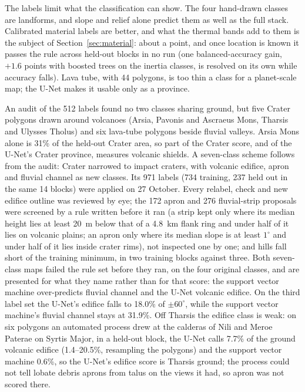 \documentclass[twocolumn]{aastex701}
\newcommand{\pmsixty}{$\pm60^{\circ}$}
\begin{document}
The labels limit what the classification can show. The four hand-drawn classes are landforms, and slope and relief
alone predict them as well as the full stack. Calibrated material labels are better, and what the thermal bands add to them is the subject of
Section~\ref{sec:material}: about a point, and once location is known it passes the rule across held-out blocks in no
run (one balanced-accuracy gain, $+1.6$ points with boosted trees on the inertia classes, is resolved on its own while
accuracy falls).
Lava tube, with 44 polygons, is too thin a class for a planet-scale map; the U-Net makes it
usable only as a province.

An audit of the 512 labels found no two classes sharing ground, but five Crater polygons drawn around volcanoes (Arsia,
Pavonis and Ascraeus Mons, Tharsis and Ulysses Tholus) and six lava-tube polygons beside fluvial valleys. Arsia Mons
alone is 31\% of the held-out Crater area, so part of the Crater score, and of the U-Net's Crater province, measures
volcanic shields. A seven-class scheme follows from the audit: Crater narrowed to impact craters, with volcanic edifice,
apron and fluvial channel as new classes. Its 971 labels (734 training, 237 held out in the same 14 blocks) were
applied on 27 October. Every relabel, check and new edifice outline was reviewed by eye; the 172 apron and 276
fluvial-strip proposals were screened by a rule written before it ran (a strip kept only where its median height lies
at least 20~m below that of a 4.8~km flank ring and under half of it lies on volcanic plains; an apron only where its
median slope is at least $1^{\circ}$ and under half of it lies inside crater rims), not inspected one by one; and
hills fall short of the training minimum, in two training blocks against three. Both seven-class maps failed the
rule set before they ran, on the four original classes, and are presented for what they name rather than for that
score: the support vector machine over-predicts fluvial channel and the U-Net volcanic edifice. On the third label
set the U-Net's edifice falls to 18.0\% of \pmsixty, while the support vector machine's fluvial channel stays at 31.9\%.
Off Tharsis the edifice class is weak: on six polygons an automated process drew at the calderas of Nili and Meroe Paterae
on Syrtis Major, in a held-out block, the U-Net calls 7.7\% of the ground volcanic edifice (1.4--20.5\%,
resampling the polygons) and the support vector machine 0.6\%, so the U-Net's edifice score is Tharsis ground;
the process could not tell lobate debris aprons from talus on the views it had, so apron was not scored there.
\end{document}

